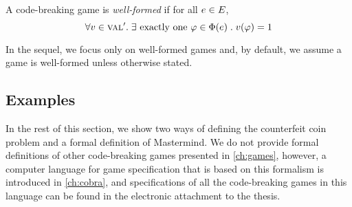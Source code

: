 \begin{definition} \label{def:wellformed}
A code-breaking game is \emph{well-formed} if for all $e \in E$,
\begin{equation}
\forall v\in\textsc{val}'.\;
  \exists \textrm{ exactly one }
     \varphi\in\Phi(e)\;.\; v(\varphi) = 1
\end{equation}
\end{definition}

In the sequel, we focus only on well-formed games and, by default,
  we assume a game is well-formed unless otherwise stated.

\subsection{Examples}
In the rest of this section, we show two ways of defining the counterfeit coin
  problem and a formal definition of Mastermind.
We do not provide formal definitions of other code-breaking games
  presented in \autoref{ch:games},
  however, a computer language for game specification
  that is based on this formalism is introduced in \autoref{ch:cobra},
  and specifications of all the code-breaking games
  in this language can be found in the electronic attachment to the thesis.

